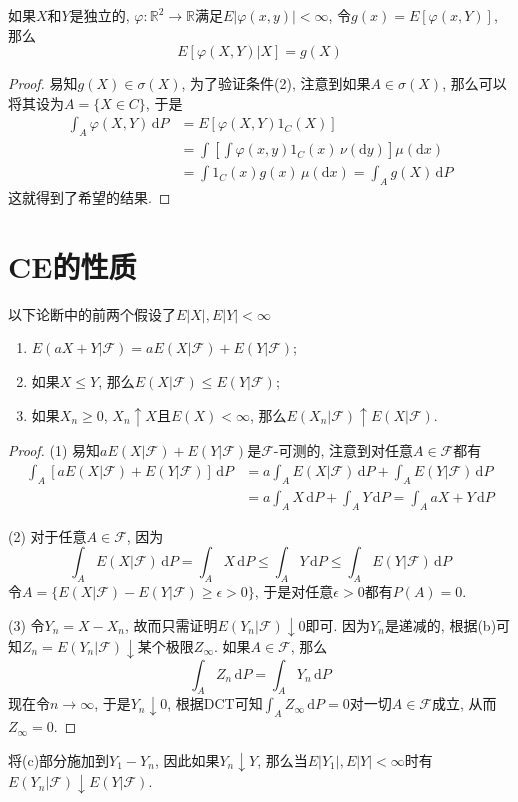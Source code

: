 \documentclass[cn, 12pt, math=mtpro2, bibstyle=apa, blue, twocol]{elegantbook}
\newcommand{\F}{\mathcal{F}}
\newcommand{\R}{\mathbb{R}}
\begin{document}
\begin{example}
如果$X$和$Y$是独立的, $\varphi:\R^2\to\R$满足$E|\varphi(x,y)|<\infty$, 令$g(x)=E[\varphi(x,Y)]$, 那么
$$E[\varphi(X,Y)|X]=g(X)$$
\end{example}
\begin{proof}
  易知$g(X)\in\sigma(X)$, 为了验证条件(2), 注意到如果$A\in\sigma(X)$, 那么可以将其设为$A=\{X\in C\}$, 于是
  \begin{align*}
  \int_A\varphi(X,Y)\,\text{d}P&=E[\varphi(X,Y)1_C(X)] \\
  &=\int\left[\int\varphi(x,y)1_C(x)\,\nu(\text{d}y)\right]\mu(\text{d}x) \\
  &=\int1_C(x)g(x)\,\mu(\text{d}x)=\int_Ag(X)\,\text{d}P
  \end{align*}
这就得到了希望的结果.
\end{proof}


\section{CE的性质}
\begin{theorem}\label{thm:thm4.1}
  以下论断中的前两个假设了$E|X|, E|Y|<\infty$
  \begin{enumerate}[label=(\arabic*)]
    \item $E(aX+Y|\F)=aE(X|\F)+E(Y|\F)$;
    \item 如果$X\leq Y$, 那么$E(X|\F)\leq E(Y|\F)$;
    \item 如果$X_n\ge0$, $X_n\uparrow X$且$E(X)<\infty$, 那么$E(X_n|\F)\uparrow E(X|\F)$.
  \end{enumerate}
\end{theorem}
\begin{proof}
  (1) 易知$aE(X|\F)+E(Y|\F)$是$\F$-可测的, 注意到对任意$A\in\F$都有
  \begin{align*}
  \int_A[aE(X|\F)+E(Y|\F)]\,\text{d}P&=a\int_AE(X|\F)\,\text{d}P+\int_AE(Y|\F)\,\text{d}P \\
  &=a\int_AX\,\text{d}P+\int_AY\,\text{d}P=\int_A aX+Y\,\text{d}P
  \end{align*}

  (2) 对于任意$A\in\F$, 因为
  $$\int_AE(X|\F)\,\text{d}P=\int_AX\,\text{d}P\leq\int_AY\,\text{d}P\leq\int_AE(Y|\F)\,\text{d}P$$
  令$A=\{E(X|\F)-E(Y|\F)\ge\epsilon>0\}$, 于是对任意$\epsilon>0$都有$P(A)=0$.

  (3) 令$Y_n=X-X_n$, 故而只需证明$E(Y_n|\F)\downarrow 0$即可. 因为$Y_n$是递减的, 根据(b)可知$Z_n=E(Y_n|\F)\downarrow$某个极限$Z_\infty$. 如果$A\in\F$, 那么
  $$\int_AZ_n\,\text{d}P=\int_AY_n\,\text{d}P$$
  现在令$n\to\infty$, 于是$Y_n\downarrow 0$, 根据DCT可知$\int_AZ_\infty\,\text{d}P=0$对一切$A\in\F$成立, 从而$Z_\infty=0$.
\end{proof}
\begin{remark}
将(c)部分施加到$Y_1-Y_n$, 因此如果$Y_n\downarrow Y$, 那么当$E|Y_1|, E|Y|<\infty$时有$E(Y_n|\F)\downarrow E(Y|\F)$.
\end{remark}
\end{document}
